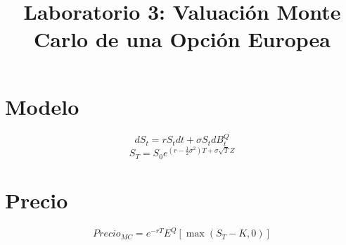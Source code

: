 \documentclass[12pt]{article}
\begin{document}
\title{Laboratorio 3: Valuación Monte Carlo de una Opción Europea}
\maketitle
\section{Modelo}
\[ dS_t=rS_tdt+\sigma S_t dB_t^Q \]
\[ S_T=S_0 e^{(r-\frac12\sigma^2)T+\sigma\sqrt{T}Z} \]
\section{Precio}
\[ Precio_{MC}=e^{-rT}E^Q[\max(S_T-K,0)] \]
\end{document}
